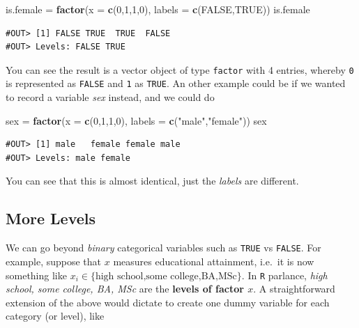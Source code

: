 \documentclass[]{book}
\newenvironment{Shaded}{\begin{snugshade}}{\end{snugshade}}
\newcommand{\KeywordTok}[1]{\textcolor[rgb]{0.13,0.29,0.53}{\textbf{#1}}}
\newcommand{\DataTypeTok}[1]{\textcolor[rgb]{0.13,0.29,0.53}{#1}}
\newcommand{\DecValTok}[1]{\textcolor[rgb]{0.00,0.00,0.81}{#1}}
\newcommand{\StringTok}[1]{\textcolor[rgb]{0.31,0.60,0.02}{#1}}
\newcommand{\OtherTok}[1]{\textcolor[rgb]{0.56,0.35,0.01}{#1}}
\newcommand{\NormalTok}[1]{#1}
\begin{document}
\begin{Shaded}
\begin{Highlighting}[]
\NormalTok{is.female =}\StringTok{ }\KeywordTok{factor}\NormalTok{(}\DataTypeTok{x =} \KeywordTok{c}\NormalTok{(}\DecValTok{0}\NormalTok{,}\DecValTok{1}\NormalTok{,}\DecValTok{1}\NormalTok{,}\DecValTok{0}\NormalTok{), }\DataTypeTok{labels =} \KeywordTok{c}\NormalTok{(}\OtherTok{FALSE}\NormalTok{,}\OtherTok{TRUE}\NormalTok{))}
\NormalTok{is.female}
\end{Highlighting}
\end{Shaded}

\begin{verbatim}
#OUT> [1] FALSE TRUE  TRUE  FALSE
#OUT> Levels: FALSE TRUE
\end{verbatim}

You can see the result is a vector object of type \texttt{factor} with 4
entries, whereby \texttt{0} is represented as \texttt{FALSE} and
\texttt{1} as \texttt{TRUE}. An other example could be if we wanted to
record a variable \emph{sex} instead, and we could do

\begin{Shaded}
\begin{Highlighting}[]
\NormalTok{sex =}\StringTok{ }\KeywordTok{factor}\NormalTok{(}\DataTypeTok{x =} \KeywordTok{c}\NormalTok{(}\DecValTok{0}\NormalTok{,}\DecValTok{1}\NormalTok{,}\DecValTok{1}\NormalTok{,}\DecValTok{0}\NormalTok{), }\DataTypeTok{labels =} \KeywordTok{c}\NormalTok{(}\StringTok{"male"}\NormalTok{,}\StringTok{"female"}\NormalTok{))}
\NormalTok{sex}
\end{Highlighting}
\end{Shaded}

\begin{verbatim}
#OUT> [1] male   female female male  
#OUT> Levels: male female
\end{verbatim}

You can see that this is almost identical, just the \emph{labels} are
different.

\subsection{More Levels}\label{more-levels}

We can go beyond \emph{binary} categorical variables such as
\texttt{TRUE} vs \texttt{FALSE}. For example, suppose that \(x\)
measures educational attainment, i.e.~it is now something like
\(x_i \in \{\text{high school,some college,BA,MSc}\}\). In \texttt{R}
parlance, \emph{high school, some college, BA, MSc} are the
\textbf{levels of factor \(x\)}. A straightforward extension of the
above would dictate to create one dummy variable for each category (or
level), like
\end{document}
